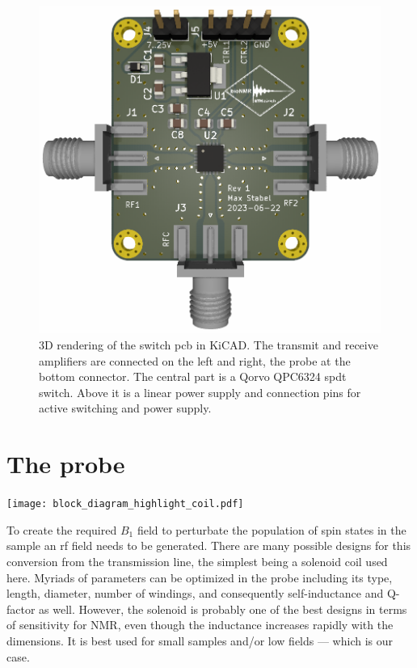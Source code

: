 \begin{figure}[hbt]
    \centering
    \includegraphics[width=\textwidth]{images/tr_switch.png}
    \caption{ 3D rendering of the switch \acrshort{pcb} in KiCAD. The transmit and receive amplifiers are connected on the left and right, the probe at the bottom connector. The central part is a Qorvo QPC6324 \acrfull{spdt} switch. Above it is a linear power supply and connection pins for active switching and power supply.}
\end{figure}

\section{The probe}
\begin{marginfigure}[-4.5\baselineskip]
    \texttt{[image: block\_diagram\_highlight\_coil.pdf]}
\end{marginfigure}
To create the required \(B_1\) field to perturbate the population of spin states in the sample an \acrshort{rf} field needs to be generated. There are many possible designs for this conversion from the transmission line, the simplest being a solenoid coil used here. Myriads of parameters can be optimized in the probe including its type, length, diameter, number of windings, and consequently self-inductance and Q-factor as well. However, the solenoid is probably one of the best designs in terms of sensitivity for NMR, even though the inductance increases rapidly with the dimensions. It is best used for small samples and/or low fields  --- which is our case.

